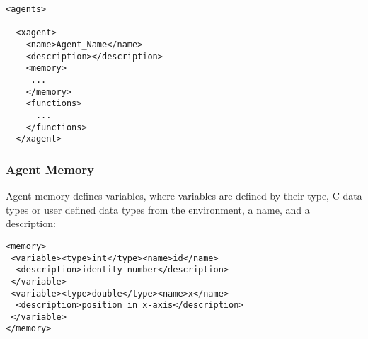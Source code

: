 \begin{mylisting}
\begin{verbatim}
<agents>

  <xagent>
    <name>Agent_Name</name>
    <description></description>
    <memory>
     ...
    </memory>
    <functions>
      ...
    </functions>
  </xagent>
\end{verbatim}
\end{mylisting}
% 


\subsubsection{Agent Memory}

Agent memory defines variables, where variables are defined by their type, C
data types or user defined data types from the environment, a name, and a
description:

\begin{mylisting}
\begin{verbatim}
<memory>
 <variable><type>int</type><name>id</name>
  <description>identity number</description>
 </variable>
 <variable><type>double</type><name>x</name>
  <description>position in x-axis</description>
 </variable>
</memory>
\end{verbatim}
\end{mylisting}

